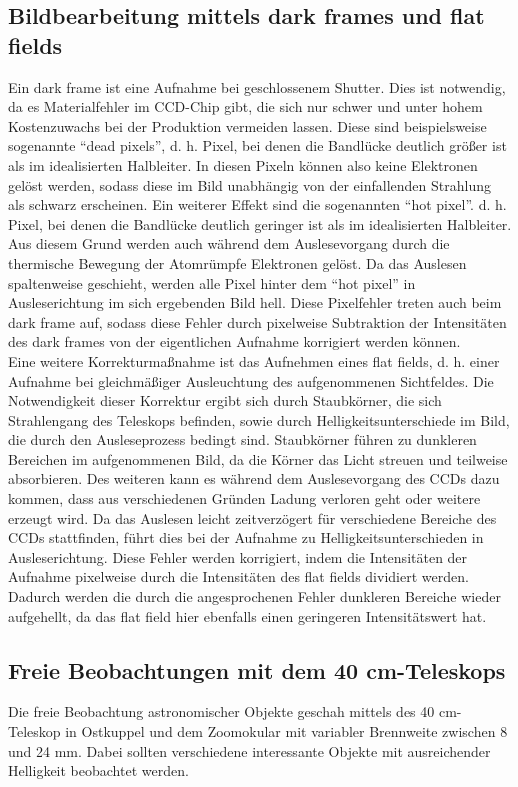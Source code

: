 \subsection{Bildbearbeitung mittels dark frames und flat fields}
Ein dark frame ist eine Aufnahme bei geschlossenem Shutter. Dies ist notwendig, da es Materialfehler im CCD-Chip gibt, die sich nur schwer und unter hohem Kostenzuwachs bei der Produktion vermeiden lassen. Diese sind beispielsweise sogenannte \enquote{dead pixels}, d. h. Pixel, bei denen die Bandlücke deutlich größer ist als im idealisierten Halbleiter. In diesen Pixeln können also keine Elektronen gelöst werden, sodass diese im Bild unabhängig von der einfallenden Strahlung als schwarz erscheinen.
Ein weiterer Effekt sind die sogenannten \enquote{hot pixel}. d. h. Pixel, bei denen die Bandlücke deutlich geringer ist als im idealisierten Halbleiter. Aus diesem Grund  werden auch während dem Auslesevorgang durch die thermische Bewegung der Atomrümpfe Elektronen gelöst. Da das Auslesen spaltenweise geschieht, werden alle Pixel hinter dem \enquote{hot pixel} in Ausleserichtung im sich ergebenden Bild hell. Diese Pixelfehler treten auch beim dark frame auf, sodass diese Fehler durch pixelweise Subtraktion der Intensitäten des dark frames von der eigentlichen Aufnahme korrigiert werden können. \\
Eine weitere Korrekturmaßnahme ist das Aufnehmen eines flat fields, d. h. einer Aufnahme bei gleichmäßiger Ausleuchtung des aufgenommenen Sichtfeldes. Die Notwendigkeit dieser Korrektur ergibt sich durch Staubkörner, die sich Strahlengang des Teleskops befinden, sowie durch Helligkeitsunterschiede im Bild, die durch den Ausleseprozess bedingt sind. Staubkörner führen zu dunkleren Bereichen im aufgenommenen Bild, da die Körner das Licht streuen und teilweise absorbieren. Des weiteren kann es während dem Auslesevorgang des CCDs dazu kommen, dass aus verschiedenen Gründen Ladung verloren geht oder weitere erzeugt wird. Da das Auslesen leicht zeitverzögert für verschiedene Bereiche des CCDs stattfinden, führt dies bei der Aufnahme zu Helligkeitsunterschieden in Ausleserichtung. Diese Fehler werden korrigiert, indem die Intensitäten der Aufnahme pixelweise durch die Intensitäten des flat fields dividiert werden. Dadurch werden die durch die angesprochenen Fehler dunkleren Bereiche wieder aufgehellt, da das flat field hier ebenfalls einen geringeren Intensitätswert hat. 

\subsection{Freie Beobachtungen mit dem 40 cm-Teleskops}
Die freie Beobachtung astronomischer Objekte geschah mittels des 40 cm-Teleskop in Ostkuppel und dem Zoomokular mit variabler Brennweite zwischen 8 und 24 mm. Dabei sollten verschiedene interessante Objekte mit ausreichender Helligkeit beobachtet werden.  